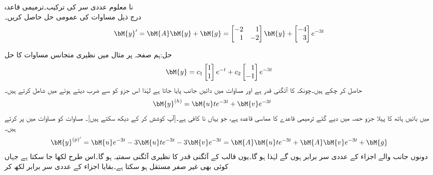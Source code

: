 \quad نا معلوم عددی سر کی ترکیب۔ترمیمی قاعدہ\\
درج ذیل مساوات کی عمومی حل حاصل کریں۔
\begin{align}\label{مساوات_مثال_غیر_متجانس_نا_معلوم_سر_الف}
\bM{y}'=\bM{A}\bM{y}+\bM{g}=\begin{bmatrix*}[r] -2&1\\1&-2 \end{bmatrix*} \bM{y}+\begin{bmatrix*}[r] -4\\3 \end{bmatrix*} e^{-3t}
\end{align}

حل:ہم صفحہ  پر مثال  میں نظیری متجانس مساوات کا حل 
\begin{align}\label{مساوات_مثال_غیر_متجانس_نا_معلوم_سر_ب}
\bM{y}=c_1\begin{bmatrix} 1 \\ 1 \end{bmatrix}e^{-t}+c_2\begin{bmatrix*}[r] 1\\ -1 \end{bmatrix*}e^{-3t}
\end{align}
حاصل کر چکے ہیں۔چونکہ  کا   آئگنی قدر ہے اور مساوات  میں دائیں جانب  پایا جاتا ہے لہٰذا  اس جزو کو  سے ضرب دیتے ہوئے  میں شامل کرتے ہیں۔
\begin{align}\label{مساوات_مثال_غیر_متجانس_نا_معلوم_سر_پ}
\bM{y}^{(h)}=\bM{u}te^{-3t}+\bM{v}e^{-3t} \quad \quad 
\end{align} 
 میں بائیں ہاتھ کا پہلا جزو حصہ  میں دیے گئے  ترمیمی قاعدے کا مماسی قاعدہ ہے، جو یہاں نا کافی ہے۔[آپ کوشش کر کے دیکھ سکتے ہیں]۔ مساوات  کو مساوات  میں پر کرتے ہیں۔
\begin{align*}
\bM{y}^{(p)'}=\bM{u}e^{-3t}-3\bM{u}te^{-3t}-3\bM{v}e^{-3t}=\bM{A}\bM{u}te^{-3t}+\bM{A}\bM{v}e^{-3t}+\bM{g}
\end{align*}
دونوں جانب  والے اجزاء کے عددی سر برابر ہوں گے لہٰذا  ہو گا۔یوں  قالب کے آئگنی قدر  کا نظیری آئگنی سمتیہ  ہو گا۔اس طرح  لکھا جا سکتا ہے جہاں  کوئی بھی غیر صفر مستقل ہو سکتا ہے۔بقایا اجزاء کے عددی سر برابر لکھ کر
